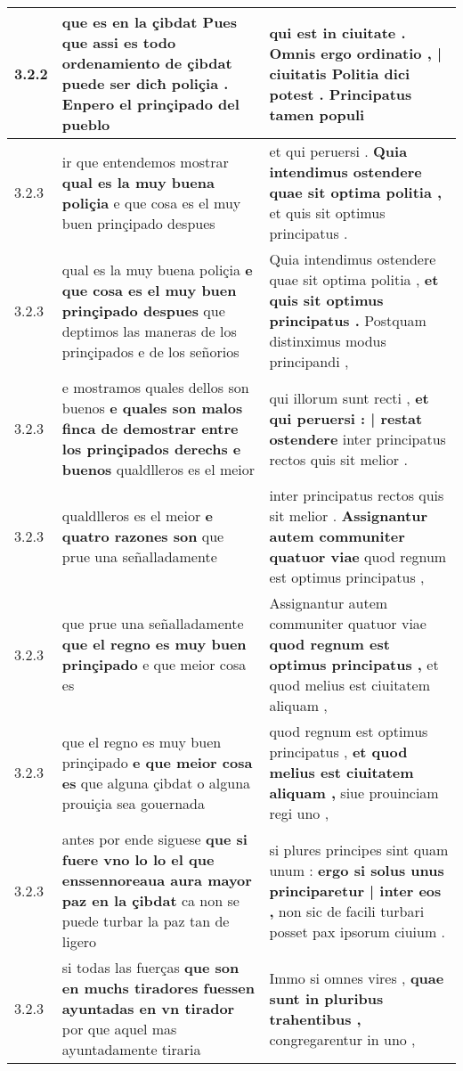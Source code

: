 \begin{tabular}{|p{1cm}|p{6.5cm}|p{6.5cm}|}
3.2.2 & que es en la çibdat \textbf{ Pues que assi es todo ordenamiento de çibdat puede ser dicħ poliçia . } Enpero el prinçipado del pueblo & qui est in ciuitate . \textbf{ Omnis ergo ordinatio , | ciuitatis Politia dici potest . } Principatus tamen populi \\\hline
3.2.3 & ir que entendemos mostrar \textbf{ qual es la muy buena poliçia } e que cosa es el muy buen prinçipado despues & et qui peruersi . \textbf{ Quia intendimus ostendere quae sit optima politia , } et quis sit optimus principatus . \\\hline
3.2.3 & qual es la muy buena poliçia \textbf{ e que cosa es el muy buen prinçipado despues } que deptimos las maneras de los prinçipados e de los señorios & Quia intendimus ostendere quae sit optima politia , \textbf{ et quis sit optimus principatus . } Postquam distinximus modus principandi , \\\hline
3.2.3 & e mostramos quales dellos son buenos \textbf{ e quales son malos finca de demostrar entre los prinçipados derechs e buenos } qualdlleros es el meior & qui illorum sunt recti , \textbf{ et qui peruersi : | restat ostendere } inter principatus rectos quis sit melior . \\\hline
3.2.3 & qualdlleros es el meior \textbf{ e quatro razones son } que prue una señalladamente & inter principatus rectos quis sit melior . \textbf{ Assignantur autem communiter quatuor viae } quod regnum est optimus principatus , \\\hline
3.2.3 & que prue una señalladamente \textbf{ que el regno es muy buen prinçipado } e que meior cosa es & Assignantur autem communiter quatuor viae \textbf{ quod regnum est optimus principatus , } et quod melius est ciuitatem aliquam , \\\hline
3.2.3 & que el regno es muy buen prinçipado \textbf{ e que meior cosa es } que alguna çibdat o alguna prouiçia sea gouernada & quod regnum est optimus principatus , \textbf{ et quod melius est ciuitatem aliquam , } siue prouinciam regi uno , \\\hline
3.2.3 & antes por ende siguese \textbf{ que si fuere vno lo lo el que enssennoreaua aura mayor paz en la çibdat } ca non se puede turbar la paz tan de ligero & si plures principes sint quam unum : \textbf{ ergo si solus unus principaretur | inter eos , } non sic de facili turbari posset pax ipsorum ciuium . \\\hline
3.2.3 & si todas las fuerças \textbf{ que son en muchs tiradores fuessen ayuntadas en vn tirador } por que aquel mas ayuntadamente tiraria & Immo si omnes vires , \textbf{ quae sunt in pluribus trahentibus , } congregarentur in uno , \\\hline

\end{tabular}
